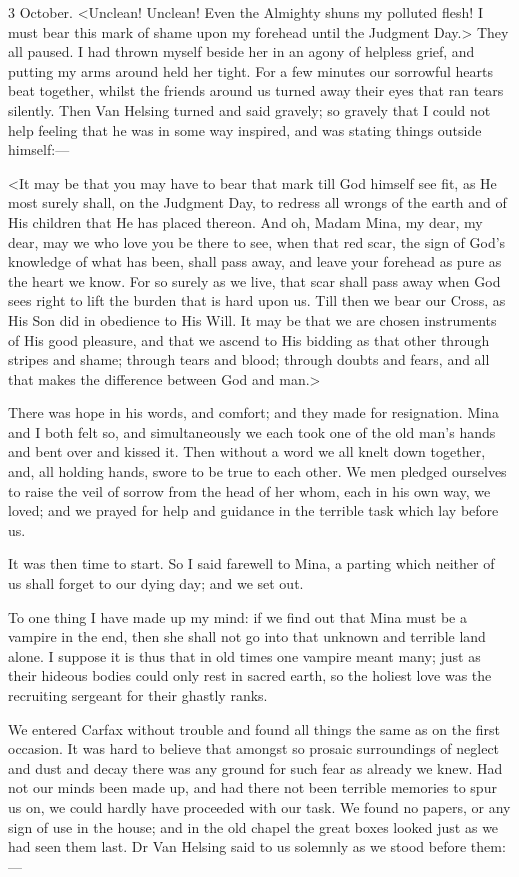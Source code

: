 \begin{diary}{3 October.}
<Unclean! Unclean! Even the Almighty shuns my polluted flesh! I must bear this mark of shame upon my forehead until the Judgment Day.> They all paused. I had thrown myself beside her in an agony of helpless grief, and putting my arms around held her tight. For a few minutes our sorrowful hearts beat together, whilst the friends around us turned away their eyes that ran tears silently. Then Van Helsing turned and said gravely; so gravely that I could not help feeling that he was in some way inspired, and was stating things outside himself:—

<It may be that you may have to bear that mark till God himself see fit, as He most surely shall, on the Judgment Day, to redress all wrongs of the earth and of His children that He has placed thereon. And oh, Madam Mina, my dear, my dear, may we who love you be there to see, when that red scar, the sign of God's knowledge of what has been, shall pass away, and leave your forehead as pure as the heart we know. For so surely as we live, that scar shall pass away when God sees right to lift the burden that is hard upon us. Till then we bear our Cross, as His Son did in obedience to His Will. It may be that we are chosen instruments of His good pleasure, and that we ascend to His bidding as that other through stripes and shame; through tears and blood; through doubts and fears, and all that makes the difference between God and man.>

There was hope in his words, and comfort; and they made for resignation. Mina and I both felt so, and simultaneously we each took one of the old man's hands and bent over and kissed it. Then without a word we all knelt down together, and, all holding hands, swore to be true to each other. We men pledged ourselves to raise the veil of sorrow from the head of her whom, each in his own way, we loved; and we prayed for help and guidance in the terrible task which lay before us.

It was then time to start. So I said farewell to Mina, a parting which neither of us shall forget to our dying day; and we set out.

To one thing I have made up my mind: if we find out that Mina must be a vampire in the end, then she shall not go into that unknown and terrible land alone. I suppose it is thus that in old times one vampire meant many; just as their hideous bodies could only rest in sacred earth, so the holiest love was the recruiting sergeant for their ghastly ranks.

We entered Carfax without trouble and found all things the same as on the first occasion. It was hard to believe that amongst so prosaic surroundings of neglect and dust and decay there was any ground for such fear as already we knew. Had not our minds been made up, and had there not been terrible memories to spur us on, we could hardly have proceeded with our task. We found no papers, or any sign of use in the house; and in the old chapel the great boxes looked just as we had seen them last. Dr Van Helsing said to us solemnly as we stood before them:—


\end{diary}
